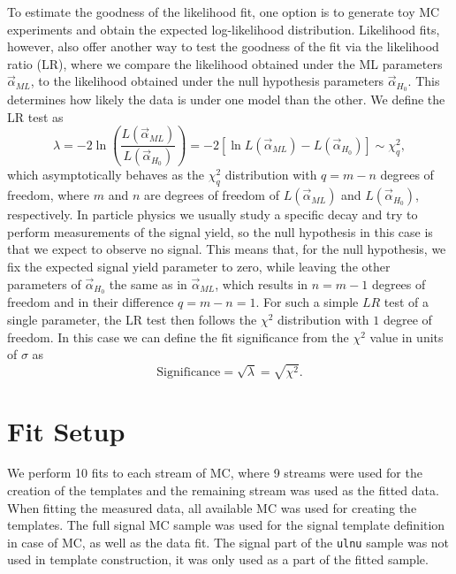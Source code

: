 To estimate the goodness of the likelihood fit, one option is to generate toy MC experiments and obtain the expected log-likelihood distribution. Likelihood fits, however, also offer another way to test the goodness of the fit via the likelihood ratio (LR), where we compare the likelihood obtained under the ML parameters $\vec\alpha_{ML}$, to the likelihood obtained under the null hypothesis parameters $\vec\alpha_{H_0}$. This determines how likely the data is under one model than the other. We define the LR test as
\begin{equation}
\label{eq:lr}
\lambda = -2\ln\left(\frac{L(\vec \alpha_{ML})}{L(\vec \alpha_{H_0})}\right) = -2 \left[ \ln L(\vec \alpha_{ML}) - L(\vec \alpha_{H_0})\right] \sim \chi^2_q,
\end{equation}
which asymptotically behaves as the $\chi^2_q$ distribution with $q=m-n$ degrees of freedom, where $m$ and $n$ are degrees of freedom of $L(\vec \alpha_{ML})$ and $L(\vec \alpha_{H_0})$, respectively. In particle physics we usually study a specific decay and try to perform measurements of the signal yield, so the null hypothesis in this case is that we expect to observe no signal. This means that, for the null hypothesis, we fix the expected signal yield parameter to zero, while leaving the other parameters of $\vec\alpha_{H_0}$ the same as in $\vec\alpha_{ML}$, which results in $n = m-1$ degrees of freedom and in their difference $q = m -n = 1$. For such a simple $LR$ test of a single parameter, the LR test then follows the $\chi^2$ distribution with $1$ degree of freedom. In this case we can define the fit significance from the $\chi^2$ value in units of $\sigma$ as
\begin{equation}
\label{eq:ss}
\mathrm{Significance} = \sqrt{\lambda} = \sqrt{\chi^2}.
\end{equation}

\section{Fit Setup}
We perform 10 fits to each stream of MC, where 9 streams were used for the creation of the templates and the remaining stream was used as the fitted data. When fitting the measured data, all available MC was used for creating the templates. The full signal MC sample was used for the signal template definition in case of MC, as well as the data fit. The signal part of the \texttt{ulnu} sample was not used in template construction, it was only used as a part of the fitted sample. 

